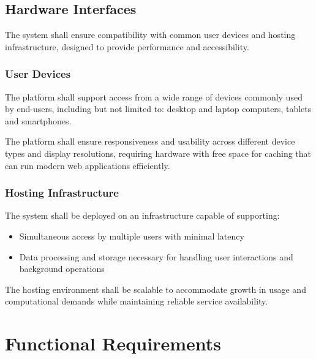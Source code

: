 \subsection{Hardware Interfaces}
\label{subsec:hardware_interfaces}

The system shall ensure compatibility with common user devices and hosting infrastructure, designed to provide performance and accessibility.

\subsubsection{User Devices}

The platform shall support access from a wide range of devices commonly used by end-users, including but not limited to: desktop and laptop computers, tablets and smartphones.

The platform shall ensure responsiveness and usability across different device types and display resolutions, requiring hardware with free space for caching that can run modern web applications efficiently.

\subsubsection{Hosting Infrastructure}

The system shall be deployed on an infrastructure capable of supporting:

\begin{itemize}
    \item Simultaneous access by multiple users with minimal latency
    \item Data processing and storage necessary for handling user interactions and background operations
\end{itemize}

The hosting environment shall be scalable to accommodate growth in usage and computational demands while maintaining reliable service availability.

\section{Functional Requirements}
\label{sec:functional_requirements}


